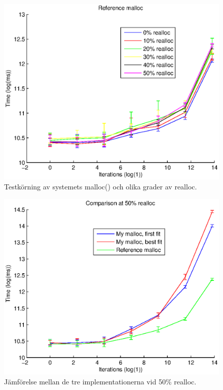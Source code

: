 \documentclass[10pt,a4paper]{article}
\begin{document}
\begin{figure}
\includegraphics[scale=0.7]{../results/ref.eps}
\caption{Testkörning av systemets malloc() och olika grader av realloc.}
\label{fig:digraph}
\end{figure}

\begin{figure}
\includegraphics[scale=0.7]{../results/comparison.eps}
\caption{Jämförelse mellan de tre implementationerna vid 50\% realloc.}
\label{fig:digraph}
\end{figure}

\begin{lstlisting}

\end{lstlisting}
\end{document}
